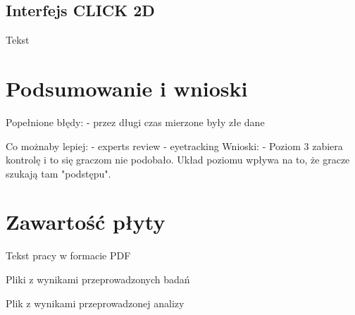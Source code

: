 \documentclass[a4paper,12pt,numbers=noenddot]{report}
\begin{document}
\section{Interfejs CLICK 2D}
Tekst
\chapter{Podsumowanie i wnioski}

Popełnione błędy: 
- przez długi czas mierzone były złe dane

Co możnaby lepiej:
- experts review
- eyetracking
Wnioski:
- Poziom 3 zabiera kontrolę i to się graczom nie podobało. Układ poziomu wpływa na to, że gracze szukają tam "podstępu".

 

\renewcommand{\listoffigures}{\begingroup
\tocchapter
{}
\endgroup}
\listoffigures
\chapter{Zawartość płyty}
\begin{enumerate}[label={[\arabic*]}]
  \item Tekst pracy w formacie PDF
  \item Pliki z wynikami przeprowadzonych badań
  \item Plik z wynikami przeprowadzonej analizy
\end{enumerate}

\end{document}
